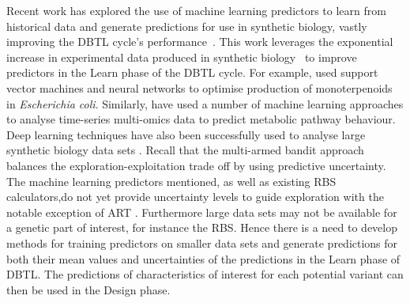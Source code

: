 \documentclass{scrartcl}[2013/05/29]%
\begin{document}
Recent work has explored the use of machine learning predictors to learn
from historical data and generate predictions for use in synthetic biology,
vastly improving the DBTL cycle's performance~\cite{Camacho2018,Radivojevic2020,LAWSON2021}.
This work leverages the exponential increase in experimental data produced in synthetic biology~\cite{Freemont2019}
to improve predictors in the Learn phase of the DBTL cycle.
For example, \textcite{Jervis2019} used support vector machines and neural networks to optimise production of monoterpenoids in \emph{Escherichia coli}.
Similarly, \textcite{Costello2018} have used a number of machine learning approaches to analyse time-series multi-omics data to predict metabolic pathway behaviour.
Deep learning techniques have also been successfully used to analyse large synthetic biology data sets \cite{Alipanahi2015,Angermueller2016,Hollerer2020}.
Recall that the multi-armed bandit approach balances the exploration-exploitation
trade off by using predictive uncertainty. The machine learning predictors
mentioned, as well as existing RBS calculators,do not yet provide uncertainty levels to guide exploration with the notable exception of ART \cite{Radivojevic2020} .
Furthermore large data sets may not be available for a genetic part of interest, for instance the RBS.
Hence there is a need to develop methods for training predictors on smaller data sets and generate predictions for both their mean values and uncertainties of the predictions in the Learn phase of DBTL. The predictions of characteristics of interest for
each potential variant
can then be used in the Design phase.
\\
\end{document}
